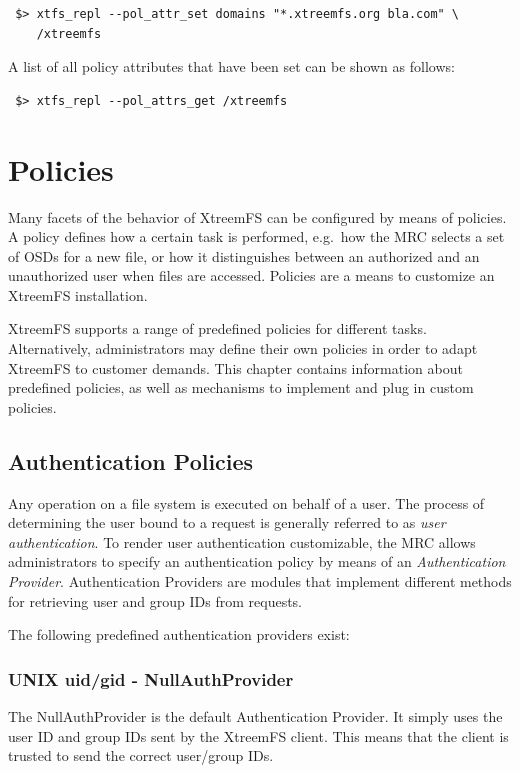 \documentclass[a4paper,10pt]{book}
\begin{document}
\begin{verbatim}
 $> xtfs_repl --pol_attr_set domains "*.xtreemfs.org bla.com" \
    /xtreemfs
\end{verbatim}

A list of all policy attributes that have been set can be shown as follows:

\begin{verbatim}
 $> xtfs_repl --pol_attrs_get /xtreemfs
\end{verbatim}

\chapter{Policies}
Many facets of the behavior of XtreemFS can be configured by means of policies. A policy defines how a certain task is performed, e.g.\ how the MRC selects a set of OSDs for a new file, or how it distinguishes between an authorized and an unauthorized user when files are accessed. Policies are a means to customize an XtreemFS installation.

XtreemFS supports a range of predefined policies for different tasks. Alternatively, administrators may define their own policies in order to adapt XtreemFS to customer demands. This chapter contains information about predefined policies, as well as mechanisms to implement and plug in custom policies.

\section{Authentication Policies} \label{sec:authentication_policies}
Any operation on a file system is executed on behalf of a user. The process of determining the user bound to a request is generally referred to as \emph{user authentication}. To render user authentication customizable, the MRC allows administrators to specify an authentication policy by means of an \emph{Authentication Provider}. Authentication Providers are modules that implement different methods for retrieving user and group IDs from requests.

The following predefined authentication providers exist:

\subsection{UNIX uid/gid - NullAuthProvider}

The NullAuthProvider is the default Authentication Provider. It simply uses the user ID and group IDs sent by the XtreemFS client. This means that the client is trusted to send the correct user/group IDs.
\end{document}

